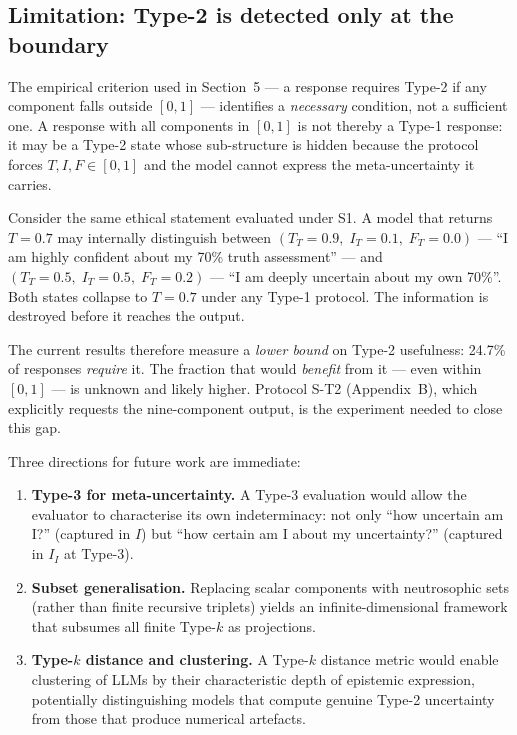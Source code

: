 \documentclass[10pt,a4paper]{article}
\begin{document}
\subsection*{Limitation: Type-2 is detected only at the boundary}

The empirical criterion used in Section~5 --- a response requires
Type-2 if any component falls outside $[0,1]$ --- identifies a
\emph{necessary} condition, not a sufficient one.
A response with all components in $[0,1]$ is not thereby
a Type-1 response: it may be a Type-2 state whose sub-structure
is hidden because the protocol forces $T,I,F \in [0,1]$ and the
model cannot express the meta-uncertainty it carries.

Consider the same ethical statement evaluated under S1.
A model that returns $T = 0.7$ may internally distinguish
between $(T_T{=}0.9,\;I_T{=}0.1,\;F_T{=}0.0)$
--- ``I am highly confident about my 70\% truth assessment'' ---
and $(T_T{=}0.5,\;I_T{=}0.5,\;F_T{=}0.2)$
--- ``I am deeply uncertain about my own 70\%''.
Both states collapse to $T = 0.7$ under any Type-1 protocol.
The information is destroyed before it reaches the output.

The current results therefore measure a \emph{lower bound}
on Type-2 usefulness: 24.7\% of responses \emph{require} it.
The fraction that would \emph{benefit} from it --- even within
$[0,1]$ --- is unknown and likely higher.
Protocol S-T2 (Appendix~B), which explicitly requests the
nine-component output, is the experiment needed to close this gap.

Three directions for future work are immediate:
\begin{enumerate}
  \item \textbf{Type-3 for meta-uncertainty.}
    A Type-3 evaluation would allow the evaluator to
    characterise its own indeterminacy: not only
    ``how uncertain am I?'' (captured in $I$) but
    ``how certain am I about my uncertainty?''
    (captured in $I_I$ at Type-3).
  \item \textbf{Subset generalisation.}
    Replacing scalar components with neutrosophic
    sets (rather than finite recursive triplets)
    yields an infinite-dimensional framework that
    subsumes all finite Type-$k$ as projections.
  \item \textbf{Type-$k$ distance and clustering.}
    A Type-$k$ distance metric would enable clustering
    of LLMs by their characteristic depth of epistemic
    expression, potentially distinguishing models that
    compute genuine Type-2 uncertainty from those
    that produce numerical artefacts.
\end{enumerate}
\end{document}

